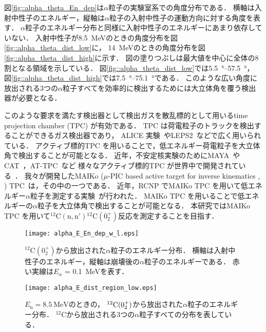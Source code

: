 \documentclass[../master]{subfiles}
\begin{document}
図\ref{fig::alpha_theta_En_dep}は$\alpha$粒子の実験室系での角度分布である．
横軸は入射中性子のエネルギー，縦軸は$\alpha$粒子の入射中性子の運動方向に対する角度を表す．
$\alpha$粒子のエネルギー分布と同様に入射中性子のエネルギーにあまり依存していない．
入射中性子が\SI{8.5}{\mega\electronvolt}のときの角度分布を図\ref{fig::alpha_theta_dist_low}に，
\SI{14}{\mega\electronvolt}のときの角度分布を図\ref{fig::alpha_theta_dist_high}に示す．
図の塗りつぶしは最大値を中心に全体の8割となる領域を示している．
図\ref{fig::alpha_theta_dist_low}では\SIrange{5.5}{57.5}{\degree}，
図\ref{fig::alpha_theta_dist_high}では\SIrange{7.5}{75.1}{\degree}である．
このような広い角度に放出される3つの$\alpha$粒子すべてを効率的に検出するためには大立体角を覆う検出器が必要となる．

このような要求を満たす検出器として検出ガスを散乱標的として用いるtime projection chamber (TPC) が有効である．
TPC は荷電粒子のトラックを検出することができるガス検出器であり，
ALICE 実験~\cite{alice-tpc}やLEPS2~\cite{kobayakawa_thesis}などで広く用いられている．
アクティブ標的TPC を用いることで，低エネルギー荷電粒子を大立体角で検出することが可能となる．
近年，不安定核実験のためにMAYA~\cite{maya}やCAT~\cite{cat-tpc}，AT-TPC~\cite{at-tpc}など
様々なアクティブ標的TPC が世界中で開発されている~\cite{active-tpc}．
我々が開発したMAIKo ($\mu$-PIC based active target for inverse kinematics $_{\circ}$)
 TPC~\cite{maiko, mupic}は，その中の一つである．
近年，RCNP でMAIKo TPC を用いて低エネルギー$\alpha$粒子を測定する実験~\cite{Furuno2019}が行われた．
MAIKo TPC を用いることで低エネルギーの$\alpha$粒子を大立体角で検出することが可能となる．
本研究ではMAIKo TPC を用いて${}^{12}\mathrm{C}(\mathrm{n},\mathrm{n}'){}^{12}\mathrm{C} (0_2^+)$反応を測定することを目指す．
\begin{figure}
  \centering
  \texttt{[image: alpha\_E\_En\_dep\_w\_l.eps]}
  \caption{${}^{12}\mathrm{C} (0_2^+)$から放出された$\alpha$粒子のエネルギー分布．
    横軸は入射中性子のエネルギー，縦軸は崩壊後の$\alpha$粒子のエネルギーである．
    赤い実線は$E_{\alpha}$ = \SI{0.1}{\mega\electronvolt}を表す．}
  \label{fig::alpha_E_En_dep_w_l}
\end{figure}
\begin{figure}
  \centering
  \texttt{[image: alpha\_E\_dist\_region\_low.eps]}
  \caption[${}^{12}{\rm C} (0_2^+)$から放出された$\alpha$粒子のエネルギー分布．]
          {$E_{\mathrm{n}}=\SI{8.5}{\mega\electronvolt}$のときの，
            ${}^{12}{\rm C} (0_2^+)$から放出された$\alpha$粒子のエネルギー分布．
            ${}^{12}\mathrm{C}$から放出される3つの$\alpha$粒子すべての分布を表している．}
          \label{fig::alpha_E_dist_low}
\end{figure}
\end{document}
